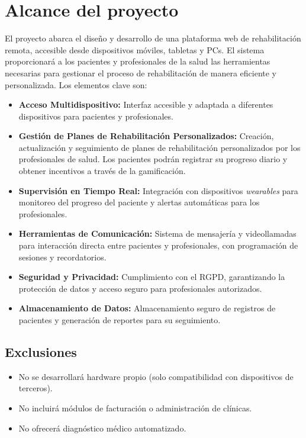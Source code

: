 \documentclass{article}
\begin{document}
\section{Alcance del proyecto}
El proyecto abarca el diseño y desarrollo de una plataforma web de rehabilitación remota, accesible desde dispositivos móviles, tabletas y PCs. El sistema proporcionará a los pacientes y profesionales de la salud las herramientas necesarias para gestionar el proceso de rehabilitación de manera eficiente y personalizada. Los elementos clave son:


\begin{itemize}
	\item \textbf{Acceso Multidispositivo:} 
	Interfaz accesible y adaptada a diferentes dispositivos para pacientes y profesionales.

	
	\item \textbf{Gestión de Planes de Rehabilitación Personalizados:} 
	Creación, actualización y seguimiento de planes de rehabilitación personalizados por los profesionales de salud. Los pacientes podrán registrar su progreso diario y obtener incentivos a través de la gamificación.

	
	\item \textbf{Supervisión en Tiempo Real:} 
	 Integración con dispositivos \textit{wearables} para monitoreo del progreso del paciente y alertas automáticas para los profesionales.
	
	
	\item \textbf{Herramientas de Comunicación:} 
	Sistema de mensajería y videollamadas para interacción directa entre pacientes y profesionales, con programación de sesiones y recordatorios.
	
	
	\item \textbf{Seguridad y Privacidad:} 
	 Cumplimiento con el RGPD, garantizando la protección de datos y acceso seguro para profesionales autorizados.
	
	
	\item \textbf{Almacenamiento de Datos:} 
	 Almacenamiento seguro de registros de pacientes y generación de reportes para su seguimiento.
	
\end{itemize}

\subsection{Exclusiones}
\begin{itemize}
	\item No se desarrollará hardware propio (solo compatibilidad con dispositivos de terceros).
	\item No incluirá módulos de facturación o administración de clínicas.
	\item No ofrecerá diagnóstico médico automatizado.
\end{itemize}
\end{document}

